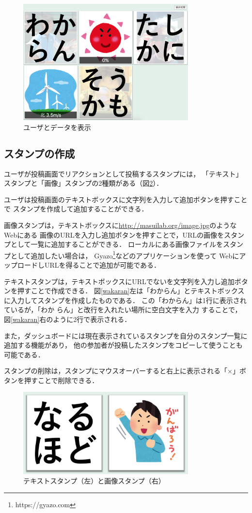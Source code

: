 \begin{figure}[H]
\centering
\includegraphics[width=9cm]{images/n_w_m_w_s.png}
\caption{ユーザとデータを表示}
\label{n_w_m_w_s}
\end{figure}

\subsection{スタンプの作成}
ユーザが投稿画面でリアクションとして投稿するスタンプには，
「テキスト」スタンプと「画像」スタンプの2種類がある（図\ref{stamp}）．

ユーザは投稿画面のテキストボックスに文字列を入力して追加ボタンを押すことで
スタンプを作成して追加することができる．

画像スタンプは，テキストボックスに\url{http://masuilab.org/image.jpg}のようなWebにある
画像のURLを入力し追加ボタンを押すことで，URLの画像をスタンプとして一覧に追加することができる．
ローカルにある画像ファイルをスタンプとして追加したい場合は，
Gyazo\footnote{https://gyazo.com}などのアプリケーションを使って
WebにアップロードしURLを得ることで追加が可能である．

テキストスタンプは，テキストボックスにURLでないを文字列を入力し追加ボタンを押すことで作成できる．
図\ref{wakaran}左は「わからん」とテキストボックスに入力してスタンプを作成したものである．
この「わからん」は1行に表示されているが，「わか らん」と改行を入れたい場所に空白文字を入力
することで，図\ref{wakaran}右のように2行で表示される．

また，ダッシュボードには現在表示されているスタンプを自分のスタンプ一覧に追加する機能があり，
他の参加者が投稿したスタンプをコピーして使うことも可能である．

スタンプの削除は，スタンプにマウスオーバーすると右上に表示される「×」ボタンを押すことで削除できる．

\begin{figure}[H]
\centering
\includegraphics[width=9cm]{images/stamp.png}
\caption{テキストスタンプ（左）と画像スタンプ（右）}
\label{stamp}
\end{figure}

